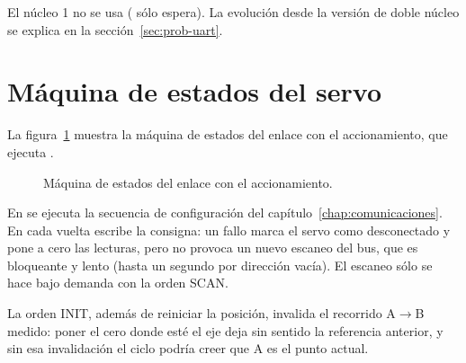 El núcleo 1 no se usa ( sólo espera). La evolución desde la versión de doble núcleo
se explica en la sección~\ref{sec:prob-uart}.

\section{Máquina de estados del servo}

La figura~\ref{fig:fsm-servo} muestra la máquina de estados del enlace con el accionamiento, que
ejecuta .

\begin{figure}[H]
\centering
{}
\caption{Máquina de estados del enlace con el accionamiento.}
\label{fig:fsm-servo}
\end{figure}

En  se ejecuta la secuencia de configuración del
capítulo~\ref{chap:comunicaciones}. En  cada vuelta escribe la consigna: un
fallo marca el servo como desconectado y pone a cero las lecturas, pero no provoca un nuevo escaneo
del bus, que es bloqueante y lento (hasta un segundo por dirección vacía). El escaneo sólo se hace
bajo demanda con la orden SCAN.

La orden INIT, además de reiniciar la posición, invalida el recorrido A$\rightarrow$B medido: poner
el cero donde esté el eje deja sin sentido la referencia anterior, y sin esa invalidación el ciclo
podría creer que A es el punto actual.

